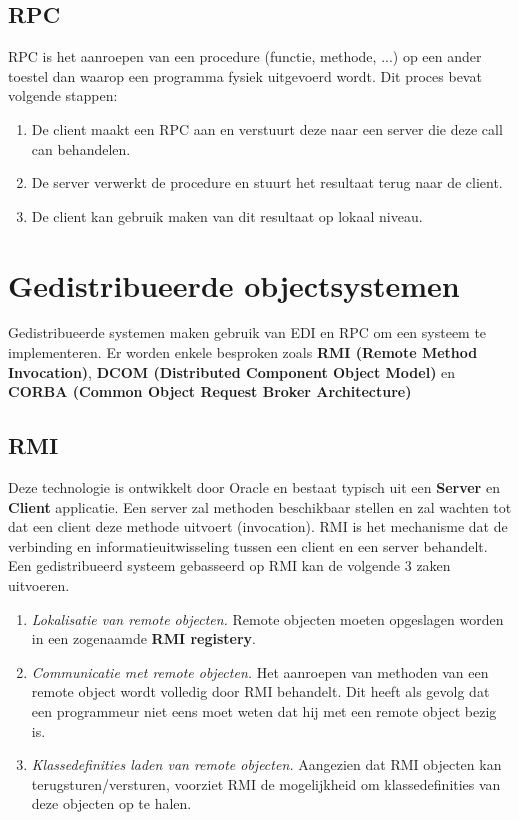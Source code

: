 \documentclass{report}
\begin{document}
\subsection{RPC}
RPC is het aanroepen van een procedure (functie, methode, ...) op een ander toestel dan waarop een programma fysiek uitgevoerd wordt. Dit proces bevat volgende stappen:
\begin{enumerate}
	\item De client maakt een RPC aan en verstuurt deze naar een server die deze call can behandelen.
	\item De server verwerkt de procedure en stuurt het resultaat terug naar de client.
	\item De client kan gebruik maken van dit resultaat op lokaal niveau.
\end{enumerate}
\section{Gedistribueerde objectsystemen}
Gedistribueerde systemen maken gebruik van EDI en RPC om een systeem te implementeren. Er worden enkele besproken zoals \textbf{RMI (Remote Method Invocation)}, \textbf{DCOM (Distributed Component Object Model)} en \textbf{CORBA (Common Object Request Broker Architecture)}
\subsection{RMI}
Deze technologie is ontwikkelt door Oracle en bestaat typisch uit een \textbf{Server} en \textbf{Client} applicatie. Een server zal methoden beschikbaar stellen en zal wachten tot dat een client deze methode uitvoert (invocation). RMI is het mechanisme dat de verbinding en informatieuitwisseling tussen een client en een server behandelt. Een gedistribueerd systeem gebasseerd op RMI kan de volgende 3 zaken uitvoeren.
\begin{enumerate}
	\item \textit{Lokalisatie van remote objecten.} Remote objecten moeten opgeslagen worden in een zogenaamde \textbf{RMI registery}.
	\item \textit{Communicatie met remote objecten.} Het aanroepen van methoden van een remote object wordt volledig door RMI behandelt. Dit heeft als gevolg dat een programmeur niet eens moet weten dat hij met een remote object bezig is.
	\item \textit{Klassedefinities laden van remote objecten.} Aangezien dat RMI objecten kan terugsturen/versturen, voorziet RMI de mogelijkheid om klassedefinities van deze objecten op te halen.
\end{enumerate}
\end{document}
